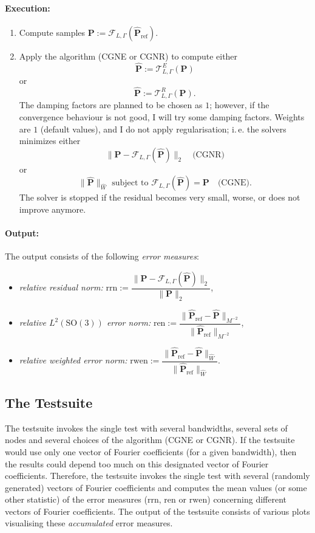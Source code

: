 \documentclass[a4paper,twoside,smallheadings,headsepline,11pt,final]{scrartcl}
\newcommand{\F}{\mathcal{F}}
\newcommand{\T}{\mathcal{T}}
\begin{document}
\paragraph*{Execution:}
\begin{enumerate}
\item Compute samples $\mathbf{P} := \F_{L, \Gamma}(\mathbf{\hat P}_{\mathrm{ref}})$.
\item Apply the algorithm (CGNE or CGNR) to compute either
\[\mathbf{\hat P} := \T_{L, \Gamma}^E(\mathbf{P})\] or
\[\mathbf{\hat P} := \T_{L, \Gamma}^R(\mathbf{P}).\]
The damping factors are planned to be chosen as $1$;
however, if the convergence behaviour is not good, I will try some damping factors.
Weights are $1$ (default values), and I do not apply regularisation;
i.\,e. the solvers minimizes either
\[\|\mathbf{P} - \F_{L, \Gamma}(\mathbf{\hat P})\|_2\quad \text{(CGNR)}\] or
\[\|\mathbf{\hat P}\|_{\hat W} \text{ subject to } \F_{L, \Gamma}(\mathbf{\hat P}) = \mathbf{P}\quad \text{(CGNE)}.\]
The solver is stopped if the residual becomes very small, worse, or does not improve anymore.
\end{enumerate}

\paragraph*{Output:}
The output consists of the following \emph{error measures}:
\begin{itemize}
\item \emph{relative residual norm:}
$\mathrm{rrn} := \dfrac{\|\mathbf{P} - \F_{L, \Gamma}(\mathbf{\hat P})\|_2}{\|\mathbf{P}\|_2}$,
\item \emph{relative $L^2(\mathrm{SO}(3))$ error norm:}
$\mathrm{ren} := \dfrac{\|\mathbf{\hat P}_{\mathrm{ref}} - \mathbf{\hat P}\|_{M^{-2}}}{\|\mathbf{\hat P}_{\mathrm{ref}}\|_{M^{-2}}}$,
\item \emph{relative weighted error norm:}
$\mathrm{rwen} := \dfrac{\|\mathbf{\hat P}_{\mathrm{ref}} - \mathbf{\hat P}\|_{\hat W}}{\|\mathbf{\hat P}_{\mathrm{ref}}\|_{\hat W}}$.
\end{itemize}

\subsection{The Testsuite}

The testsuite invokes the single test with several bandwidths, several sets of nodes and several choices of the algorithm (CGNE or CGNR).
If the testsuite would use only one vector of Fourier coefficients (for a given bandwidth), then the results could depend too much on this designated vector of Fourier coefficients.
Therefore, the testsuite invokes the single test with several (randomly generated) vectors of Fourier coefficients and computes the mean values (or some other statistic) of the error measures ($\mathrm{rrn}$, $\mathrm{ren}$ or $\mathrm{rwen}$) concerning different vectors of Fourier coefficients.
The output of the testsuite consists of various plots visualising these \emph{accumulated} error measures.
\end{document}
